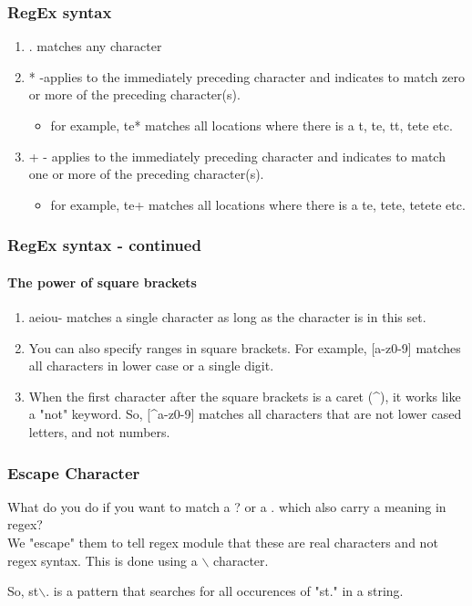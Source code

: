 \documentclass{beamer}
\begin{document}
\begin{frame}
\frametitle{RegEx syntax}
\begin{enumerate}
\item . matches any character
\item * -applies to the immediately preceding character and indicates to match zero or more of the preceding character(s).
\begin{itemize}
\item for example, te* matches all locations where there is a t, te, tt, tete etc.
\end{itemize}
\item + - applies to the immediately preceding character and indicates to match one or more of the preceding character(s).
\begin{itemize}
\item for example, te+ matches all locations where there is a te, tete, tetete etc.
\end{itemize}
\end{enumerate}
\end{frame}

\begin{frame}
\frametitle{RegEx syntax - continued}
\framesubtitle{The power of square brackets}
\begin{enumerate}
\item \lbrack aeiou\rbrack - matches a single character as long as the character is in this set.
\item You can also specify ranges in square brackets. For example, [a-z0-9] matches all characters in lower case or a single digit.
\item When the first character after the square brackets is a caret (\^{}), it works like a "not" keyword. So, [\^{}a-z0-9] matches all characters that are not lower cased letters, and not numbers.
\end{enumerate}
\end{frame}

\begin{frame}
\frametitle{Escape Character}
What do you do if you want to match a ? or a . which also carry a meaning in regex? \pause
\\ We "escape" them to tell regex module that these are real characters and not regex syntax. This is done using a $\backslash$ character. 

 \medskip So, st$\backslash$. is a pattern that searches for all occurences of "st." in a string.
\end{frame}
\end{document}
